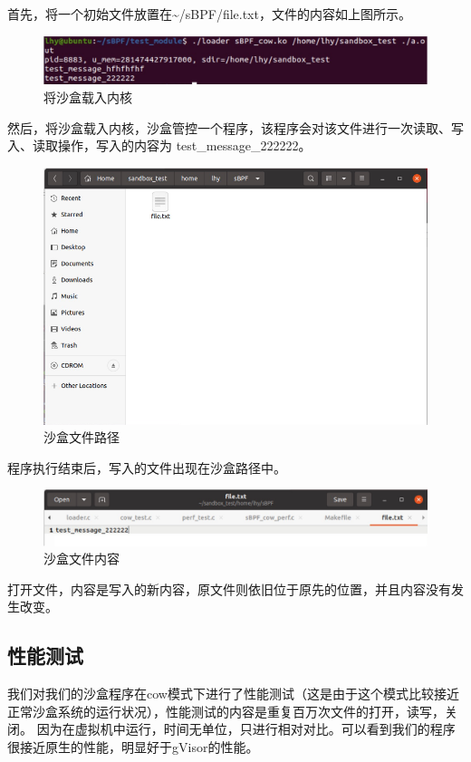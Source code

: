 \documentclass[AutoFakeBold,a4paper]{ctexart}
\begin{document}
首先，将一个初始文件放置在{\ttfamily \~{}/sBPF/file.txt}，文件的内容如上图所示。

\begin{figure}[H]
    \centering
    \includegraphics[width=\columnwidth]{pic6.png}
    \caption{将沙盒载入内核}
\end{figure}

然后，将沙盒载入内核，沙盒管控一个程序，该程序会对该文件进行一次读取、写入、读取操作，写入的内容为
{\ttfamily test\_message\_222222}。

\begin{figure}[H]
    \centering
    \includegraphics[width=\columnwidth]{pic7.png}
    \caption{沙盒文件路径}
\end{figure}

程序执行结束后，写入的文件出现在沙盒路径中。

\begin{figure}[H]
    \centering
    \includegraphics[width=\columnwidth]{pic9.png}
    \caption{沙盒文件内容}
\end{figure}

打开文件，内容是写入的新内容，原文件则依旧位于原先的位置，并且内容没有发生改变。

\subsection{性能测试}
我们对我们的沙盒程序在cow模式下进行了性能测试（这是由于这个模式比较接近正常沙盒系统的运行状况），性能测试的内容是重复百万次文件的打开，读写，关闭。
因为在虚拟机中运行，时间无单位，只进行相对对比。可以看到我们的程序很接近原生的性能，明显好于gVisor的性能\cite{234857}。
\end{document}
